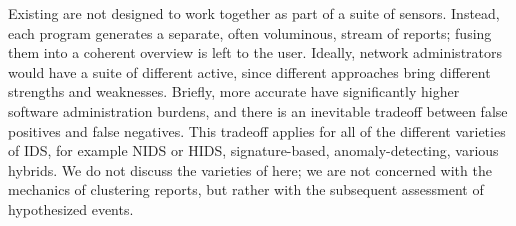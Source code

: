 Existing \idses are not designed to work together as part of a
suite of sensors.  Instead, each program generates a separate,
often voluminous, stream of reports; fusing them into a coherent 
overview is left
 to
the user. 
Ideally, network administrators would have a suite of different \idses active,
since different \ids approaches
bring different
strengths and weaknesses.
Briefly, more accurate \idses have significantly higher software
administration burdens, and there is an inevitable tradeoff between
false positives and false negatives.
This tradeoff applies for all of the different varieties of IDS,
for example NIDS or HIDS, signature-based, anomaly-detecting, various
hybrids.  We do not discuss the varieties of \idses here;
we are not concerned with the mechanics of clustering reports, but
rather with the subsequent assessment of hypothesized events.
 
